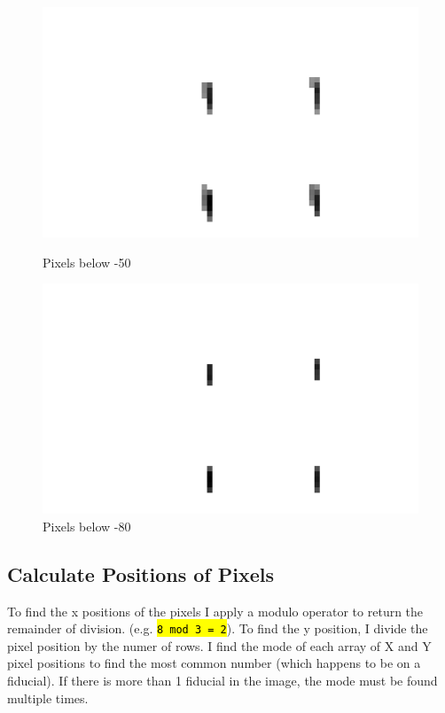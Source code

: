 \documentclass[10pt]{article}
\begin{document}
    \begin{figure}[h]
        \begin{minipage}{0.4\textwidth}
            \begin{center}
                \includegraphics[width=.75\linewidth]{plots_tables_images/below50.png}
                \caption{Pixels below -50}
            \end{center}
        \end{minipage}
        \begin{minipage}{0.4\textwidth}
            \begin{center}
                \includegraphics[width=.75\linewidth]{plots_tables_images/below80.png}
                \caption{Pixels below -80}
            \end{center}
        \end{minipage}
    \end{figure}

    \subsection{Calculate Positions of Pixels} %
    \label{sub:calculate_positions_of_pixels}
    To find the x positions of the pixels I apply a modulo operator to return the remainder of division. (e.g. \hl{\texttt{8 mod 3 = 2}}). To find the y position, I divide the pixel position by the numer of rows. I find the mode of each array of X and Y pixel positions to find the most common number (which happens to be on a fiducial). If there is more than 1 fiducial in the image, the mode must be found multiple times. 
\end{document}
